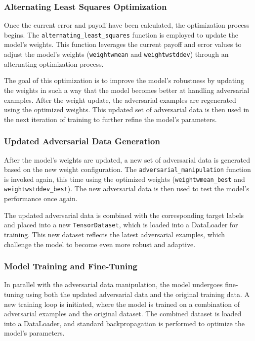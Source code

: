 \documentclass[9pt,a4paper,twoside]{rho-class/rho}
\begin{document}
\subsubsection{Alternating Least Squares Optimization}
Once the current error and payoff have been calculated, the optimization process begins. The \texttt{alternating\_least\_squares} function is employed to update the model's weights. This function leverages the current payoff and error values to adjust the model's weights (\texttt{weightwmean} and \texttt{weightwstddev}) through an alternating optimization process.

The goal of this optimization is to improve the model's robustness by updating the weights in such a way that the model becomes better at handling adversarial examples. After the weight update, the adversarial examples are regenerated using the optimized weights. This updated set of adversarial data is then used in the next iteration of training to further refine the model's parameters.

\subsubsection{Updated Adversarial Data Generation}
After the model's weights are updated, a new set of adversarial data is generated based on the new weight configuration. The \texttt{adversarial\_manipulation} function is invoked again, this time using the optimized weights (\texttt{weightwmean\_best} and \texttt{weightwstddev\_best}). The new adversarial data is then used to test the model's performance once again.

The updated adversarial data is combined with the corresponding target labels and placed into a new \texttt{TensorDataset}, which is loaded into a DataLoader for training. This new dataset reflects the latest adversarial examples, which challenge the model to become even more robust and adaptive.

\subsubsection{Model Training and Fine-Tuning}
In parallel with the adversarial data manipulation, the model undergoes fine-tuning using both the updated adversarial data and the original training data. A new training loop is initiated, where the model is trained on a combination of adversarial examples and the original dataset. The combined dataset is loaded into a DataLoader, and standard backpropagation is performed to optimize the model's parameters.
\end{document}
